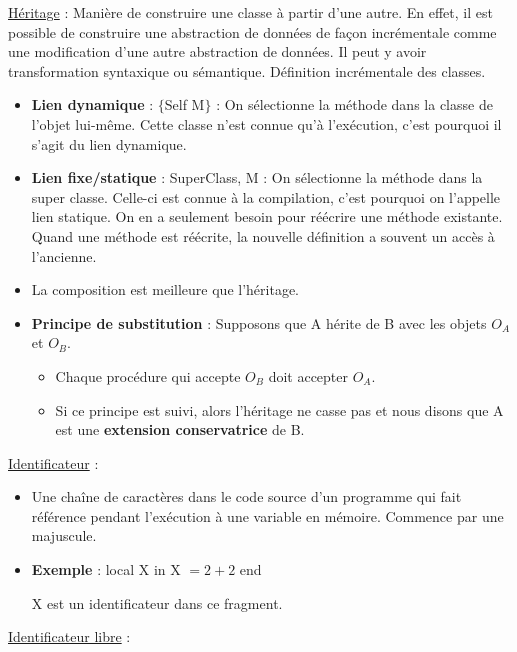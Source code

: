 \documentclass[fr,license=none,skiptoc]{../../../eplsummary}
\begin{document}
\begin{flushleft}
\textcolor{mauvedef}{\underline{Héritage}} : Manière de construire une classe à partir d’une autre.  En effet, il est possible de construire une abstraction de données de façon incrémentale comme une modification d’une autre abstraction de données. Il peut y avoir transformation syntaxique ou sémantique. Définition incrémentale des classes.

\begin{itemize}
\item \textbf{Lien dynamique} : \textcolor{miorangerouge}{$\{$Self M$\}$} : On sélectionne la méthode dans la classe de l’objet lui-même. Cette classe n’est connue qu’à l’exécution, c’est pourquoi il s’agit du lien dynamique.
\item \textbf{Lien fixe/statique} : \textcolor{miorangerouge}{SuperClass, M} : On sélectionne la méthode dans la super classe. Celle-ci est connue à la compilation, c’est pourquoi on l’appelle lien statique. On en a seulement besoin pour réécrire une méthode existante. Quand une méthode est réécrite, la nouvelle définition a souvent un accès à l'ancienne.
\item La composition est meilleure que l'héritage.
\item \textbf{Principe de substitution} : Supposons que A hérite de B avec les objets $O_A$ et $O_B$.
\begin{itemize}[label=\circ]
\item Chaque procédure qui accepte $O_B$ doit accepter $O_A$.
\item Si ce principe est suivi, alors l'héritage ne casse pas et nous disons que A est une \textbf{extension conservatrice} de B.
\end{itemize}
\end{itemize} \bigbreak



\textcolor{mauvedef}{\underline{Identificateur}} : 

\begin{itemize}
\item Une chaîne de caractères dans le code source d’un programme qui fait référence pendant l’exécution à une variable en mémoire. Commence par une majuscule.
\item \textbf{Exemple} : local X in X $=2+2$ end 

X est un identificateur dans ce fragment.
\end{itemize} \bigbreak


\textcolor{mauvedef}{\underline{Identificateur libre}} :


\end{flushleft}
\end{document}
